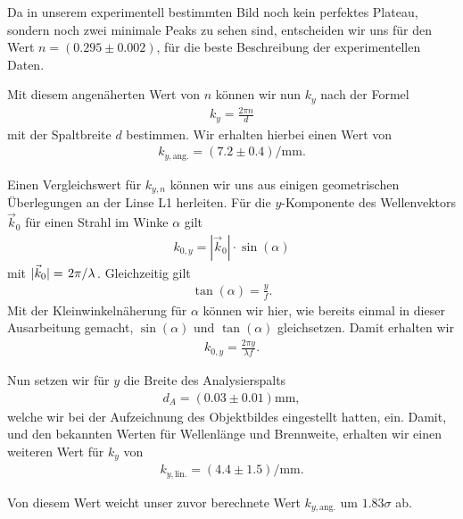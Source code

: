 Da in unserem experimentell bestimmten Bild noch kein perfektes Plateau, sondern noch zwei minimale \glqq{}Peaks\grqq{} zu sehen sind, entscheiden wir uns für den Wert $n = (0.295 \pm 0.002)$, für die beste Beschreibung der experimentellen Daten.

Mit diesem angenäherten Wert von $n$ können wir nun $k_{y}$ nach der Formel
\begin{align}
  k_{y} = \frac{2 \pi n}{d}
\end{align}
mit der Spaltbreite $d$ bestimmen. Wir erhalten hierbei einen Wert von
\begin{align}
  k_{y,\mathrm{ang.}} = (7.2 \pm 0.4)\si{\per\milli\meter}.
\end{align}

Einen Vergleichswert für $k_{y,n}$ können wir uns aus einigen geometrischen Überlegungen an der Linse L1 herleiten. Für die $y$-Komponente des Wellenvektors $\vec{k}_0$ für einen Strahl im Winke $\alpha$ gilt 
\begin{align}
  k_{0,y} = |\vec{k}_0| \cdot \sin(\alpha)
\end{align}
mit $|\vec{k}_0| = \ffrac{2\pi}{\lambda}$. Gleichzeitig gilt
\begin{align}
  \tan(\alpha) = \frac{y}{f}.
\end{align}
Mit der Kleinwinkelnäherung für $\alpha$ können wir hier, wie bereits einmal in dieser Ausarbeitung gemacht, $\sin(\alpha)$ und $\tan(\alpha)$ gleichsetzen. Damit erhalten wir
\begin{align}
  k_{0,y} = \frac{2\pi y}{\lambda f}.
\end{align}

Nun setzen wir für $y$ die Breite des Analysierspalts 
\begin{align}
  d_A = (0.03 \pm 0.01)\si{\milli\meter},
\end{align}
welche wir bei der Aufzeichnung des Objektbildes eingestellt hatten, ein. Damit, und den bekannten Werten für Wellenlänge und Brennweite, erhalten wir einen weiteren Wert für $k_y$ von
\begin{align}
  k_{y,\mathrm{lin.}} = (4.4 \pm 1.5) \si{\per\milli\meter}.
\end{align}

Von diesem Wert weicht unser zuvor berechnete Wert $k_{y,\mathrm{ang.}}$ um $1.83\sigma$ ab.